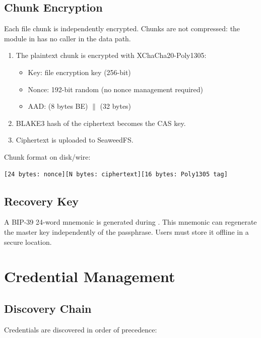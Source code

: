 \documentclass[11pt,a4paper]{article}
\begin{document}
\subsection{Chunk Encryption}

Each file chunk is independently encrypted. Chunks are not compressed: the
 module in  has no caller in the data
path.

\begin{enumerate}
  \item The plaintext chunk is encrypted with XChaCha20-Poly1305:
    \begin{itemize}
      \item Key: file encryption key (256-bit)
      \item Nonce: 192-bit random (no nonce management required)
      \item AAD:  (8 bytes BE) $\|$  (32 bytes)
    \end{itemize}
  \item BLAKE3 hash of the ciphertext becomes the CAS key.
  \item Ciphertext is uploaded to SeaweedFS.
\end{enumerate}

Chunk format on disk/wire:

\begin{lstlisting}
[24 bytes: nonce][N bytes: ciphertext][16 bytes: Poly1305 tag]
\end{lstlisting}

\subsection{Recovery Key}

A BIP-39 24-word mnemonic is generated during . This mnemonic
can regenerate the master key independently of the passphrase. Users must
store it offline in a secure location.

\section{Credential Management}

\subsection{Discovery Chain}

Credentials are discovered in order of precedence:
\end{document}
